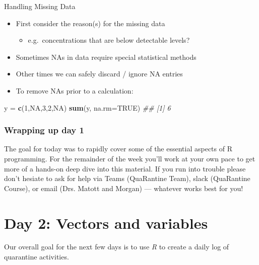 \documentclass[]{book}
\newenvironment{Shaded}{\begin{snugshade}}{\end{snugshade}}
\newcommand{\CommentTok}[1]{\textcolor[rgb]{0.56,0.35,0.01}{\textit{#1}}}
\newcommand{\DataTypeTok}[1]{\textcolor[rgb]{0.13,0.29,0.53}{#1}}
\newcommand{\DecValTok}[1]{\textcolor[rgb]{0.00,0.00,0.81}{#1}}
\newcommand{\KeywordTok}[1]{\textcolor[rgb]{0.13,0.29,0.53}{\textbf{#1}}}
\newcommand{\NormalTok}[1]{#1}
\newcommand{\OtherTok}[1]{\textcolor[rgb]{0.56,0.35,0.01}{#1}}
\newcommand{\StringTok}[1]{\textcolor[rgb]{0.31,0.60,0.02}{#1}}
\providecommand{\tightlist}{%
  \setlength{\itemsep}{0pt}\setlength{\parskip}{0pt}}
\begin{document}
Handling Missing Data

\begin{itemize}
\tightlist
\item
  First consider the reason(s) for the missing data

  \begin{itemize}
  \tightlist
  \item
    e.g.~concentrations that are below detectable levels?
  \end{itemize}
\item
  Sometimes NAs in data require special statistical methods
\item
  Other times we can safely discard / ignore NA entries
\item
  To remove NAs prior to a calculation:
\end{itemize}

\begin{Shaded}
\begin{Highlighting}[]
\NormalTok{y =}\StringTok{ }\KeywordTok{c}\NormalTok{(}\DecValTok{1}\NormalTok{,}\OtherTok{NA}\NormalTok{,}\DecValTok{3}\NormalTok{,}\DecValTok{2}\NormalTok{,}\OtherTok{NA}\NormalTok{)}
\KeywordTok{sum}\NormalTok{(y, }\DataTypeTok{na.rm=}\OtherTok{TRUE}\NormalTok{)}
\CommentTok{## [1] 6}
\end{Highlighting}
\end{Shaded}

\hypertarget{wrapping-up-day-1}{%
\subsubsection*{Wrapping up day 1}\label{wrapping-up-day-1}}

The goal for today was to rapidly cover some of the essential aspects of R programming. For the remainder of the week you'll work at your own pace to get more of a hands-on deep dive into this material. If you run into trouble please don't hesiate to ask for help via Teams (QuaRantine Team), slack (QuaRantine Course), or email (Drs. Matott and Morgan) --- whatever works best for you!

\hypertarget{day-2-vectors-and-variables}{%
\section{Day 2: Vectors and variables}\label{day-2-vectors-and-variables}}

Our overall goal for the next few days is to use \emph{R} to create a daily log of quarantine activities.
\end{document}

